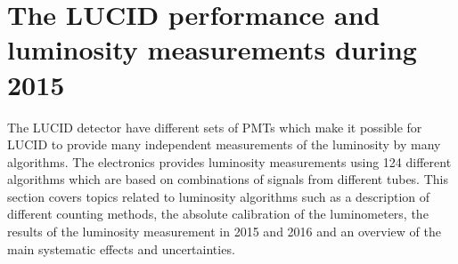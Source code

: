 
\section{The LUCID performance and luminosity measurements during 2015}
\label{sec:lucid_performance}

The LUCID detector have different sets of PMTs which make it possible for LUCID to provide many independent measurements of the luminosity by many algorithms.
The electronics provides luminosity measurements using 124 different algorithms which are based on combinations of signals from different tubes.
This section covers topics related to luminosity algorithms such as a description of different counting methods, the absolute calibration of the luminometers, 
the results of the luminosity measurement in 2015 and 2016 and an overview of the main systematic effects and uncertainties.


